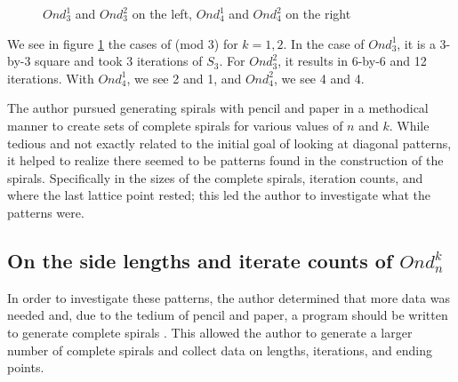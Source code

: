 \documentclass[11pt]{amsart}
\theoremstyle{mydef}
\begin{document}
\begin{figure}[h]
\centering
{}
\caption{$Ond^1_3$ and $Ond^2_3$ on the left, $Ond^1_4$ and $Ond^2_4$ on the right}
\label{fig:mod34}
\end{figure}

We see in figure \ref{fig:mod34} the cases of (mod 3) for $k=1,2$.  In the case of $Ond^1_3$, it is a 3-by-3 square and took 3 iterations of $S_3$. For $Ond^2_3$, it results in 6-by-6 and 12 iterations. With $Ond^1_4$, we see 2 and 1, and $Ond^2_4$, we see 4 and 4.

The author pursued generating spirals with pencil and paper in a methodical manner to  create sets of complete spirals for various values of $n$ and $k$. While tedious and not exactly related to the initial goal of looking at diagonal patterns, it helped to realize there seemed to be patterns found in the construction of the spirals. Specifically in the sizes of the complete spirals, iteration counts, and where the last lattice point rested; this led the author to investigate what the patterns were.

\subsection{On the side lengths and iterate counts of $Ond^k_n$}
In order to investigate these patterns, the author determined that more data was needed and, due to the tedium of pencil and paper, a program should be written to generate complete spirals \cite{PySquare}. This allowed the author to generate a larger number of complete spirals and collect data on lengths, iterations, and ending points. 
\end{document}
